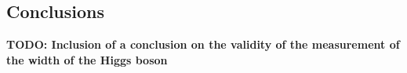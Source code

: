 \subsection{Conclusions}

{\bf \color{red} TODO: Inclusion of a conclusion on the validity of the measurement of the width of the Higgs boson}
